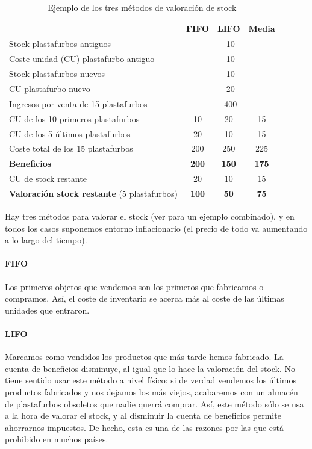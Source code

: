 \documentclass[nochap,palatino,notitlepage]{apuntes}
\begin{document}
\begin{table}[hbtp]
\centering
\begin{tabular}{l|c|c|c}
 & \textbf{FIFO} & \textbf{LIFO} & \textbf{Media} \\ \toprule
Stock plastafurbos antiguos & \multicolumn{3}{|c}{10} \\ \midrule
Coste unidad (CU) plastafurbo antiguo & \multicolumn{3}{|c}{10} \\ \midrule
Stock plastafurbos nuevos & \multicolumn{3}{|c}{10} \\ \midrule
CU plastafurbo nuevo & \multicolumn{3}{|c}{20} \\ \midrule
Ingresos por venta de 15 plastafurbos & \multicolumn{3}{|c}{400} \\ \midrule \midrule
CU de los 10 primeros plastafurbos & 10 & 20 & 15 \\ \midrule
CU de los 5 últimos plastafurbos & 20 & 10 & 15 \\ \midrule
Coste total de los 15 plastafurbos & 200 & 250 & 225 \\ \midrule
\textbf{Beneficios} & \textbf{200} & \textbf{150} & \textbf{175} \\ \midrule \midrule
CU de stock restante & 20 & 10 & 15 \\ \midrule
\textbf{Valoración stock restante} (5 plastafurbos) & \textbf{100} & \textbf{50} & \textbf{75} \\ \bottomrule
\end{tabular}
\caption{Ejemplo de los tres métodos de valoración de stock}
\label{tab:ValoracionStock}
\end{table}

Hay tres métodos para valorar el stock (ver  para un ejemplo combinado), y en todos los casos suponemos entorno inflacionario (el precio de todo va aumentando a lo largo del tiempo).

\paragraph{FIFO} Los primeros objetos que vendemos son los primeros que fabricamos o compramos. Así, el coste de inventario se acerca más al coste de las últimas unidades que entraron.

\paragraph{LIFO} Marcamos como vendidos los productos que más tarde hemos fabricado. La cuenta de beneficios disminuye, al igual que lo hace la valoración del stock. No tiene sentido usar este método a nivel físico: si de verdad vendemos los últimos productos fabricados y nos dejamos los más viejos, acabaremos con un almacén de plastafurbos obsoletos que nadie querrá comprar. Así, este método sólo se usa a la hora de valorar el stock, y al disminuir la cuenta de beneficios permite ahorrarnos impuestos. De hecho, esta es una de las razones por las que está prohibido en muchos países.
\end{document}
